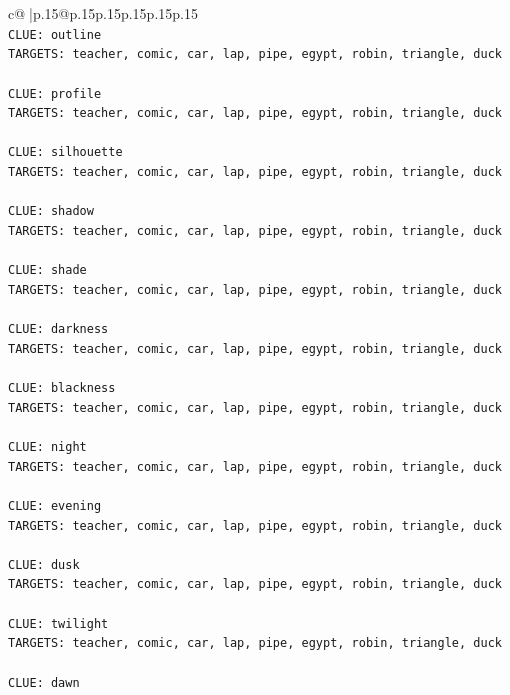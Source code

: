 \documentclass{article}
\begin{document}
{\begin{supertabular}{c@{$\;$}|p{.15\linewidth}@{}p{.15\linewidth}p{.15\linewidth}p{.15\linewidth}p{.15\linewidth}p{.15\linewidth}}
{{{\\ 
\texttt{CLUE: outline} \\
\texttt{TARGETS: teacher, comic, car, lap, pipe, egypt, robin, triangle, duck} \\
\\ 
\texttt{CLUE: profile} \\
\texttt{TARGETS: teacher, comic, car, lap, pipe, egypt, robin, triangle, duck} \\
\\ 
\texttt{CLUE: silhouette} \\
\texttt{TARGETS: teacher, comic, car, lap, pipe, egypt, robin, triangle, duck} \\
\\ 
\texttt{CLUE: shadow} \\
\texttt{TARGETS: teacher, comic, car, lap, pipe, egypt, robin, triangle, duck} \\
\\ 
\texttt{CLUE: shade} \\
\texttt{TARGETS: teacher, comic, car, lap, pipe, egypt, robin, triangle, duck} \\
\\ 
\texttt{CLUE: darkness} \\
\texttt{TARGETS: teacher, comic, car, lap, pipe, egypt, robin, triangle, duck} \\
\\ 
\texttt{CLUE: blackness} \\
\texttt{TARGETS: teacher, comic, car, lap, pipe, egypt, robin, triangle, duck} \\
\\ 
\texttt{CLUE: night} \\
\texttt{TARGETS: teacher, comic, car, lap, pipe, egypt, robin, triangle, duck} \\
\\ 
\texttt{CLUE: evening} \\
\texttt{TARGETS: teacher, comic, car, lap, pipe, egypt, robin, triangle, duck} \\
\\ 
\texttt{CLUE: dusk} \\
\texttt{TARGETS: teacher, comic, car, lap, pipe, egypt, robin, triangle, duck} \\
\\ 
\texttt{CLUE: twilight} \\
\texttt{TARGETS: teacher, comic, car, lap, pipe, egypt, robin, triangle, duck} \\
\\ 
\texttt{CLUE: dawn} \\
}}}
\end{supertabular}}
\end{document}
